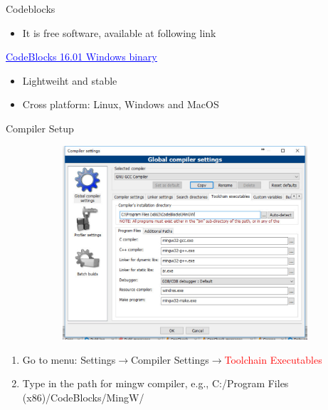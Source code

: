 \begin{frame}{Codeblocks}
\begin{itemize}
	\item {It is free software, available at following link}
\end{itemize}
\begin{center}
\href{http://121.192.176.204/sourceforge.net/projects/codeblocks/files/Binaries/16.01/Windows/codeblocks-16.01mingw-setup.exe}{\textcolor{blue}{\underline{CodeBlocks 16.01 Windows binary}}}
\end{center}
\begin{itemize}
	\item {Lightweiht and stable}
	\item {Cross platform: Linux, Windows and MacOS}
\end{itemize}
\end{frame}

\begin{frame}{Compiler Setup}
	\begin{figure}
		\begin{center}
			\begin{figure}
				\includegraphics[width=0.6\linewidth]{figs/cbx0.pdf}
			\end{figure}
		\end{center}
	\end{figure}
	\begin{enumerate}
		\item {Go to menu: Settings$\rightarrow$Compiler Settings$\rightarrow$\textcolor{red}{Toolchain Executables}}
		\item {Type in the path for mingw compiler, e.g., C:/Program Files (x86)/CodeBlocks/MingW/}
	\end{enumerate}
	
\end{frame}


